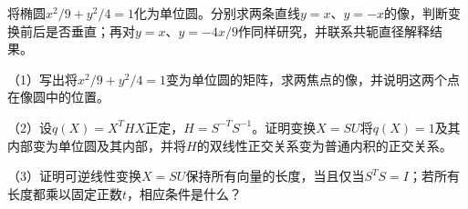 \begin{samepage}
\begin{example}
将椭圆\(x^2/9+y^2/4=1\)化为单位圆。分别求两条直线\(y=x\)、\(y=-x\)的像，判断变换前后是否垂直；再对\(y=x\)、\(y=-4x/9\)作同样研究，并联系共轭直径解释结果。
\end{example}
\end{samepage}

\begin{exercise}
\mbox{}\par\nobreak

\begin{samepage}
（1）写出将\(x^2/9+y^2/4=1\)变为单位圆的矩阵，求两焦点的像，并说明这两个点在像圆中的位置。
\par
\end{samepage}

\begin{samepage}
（2）设\(q(X)=X^THX\)正定，\(H=S^{-T}S^{-1}\)。证明变换\(X=SU\)将\(q(X)=1\)及其内部变为单位圆及其内部，并将\(H\)的双线性正交关系变为普通内积的正交关系。
\par
\end{samepage}

\begin{samepage}
（3）证明可逆线性变换\(X=SU\)保持所有向量的长度，当且仅当\(S^TS=I\)；若所有长度都乘以固定正数\(t\)，相应条件是什么？
\par
\end{samepage}
\end{exercise}
